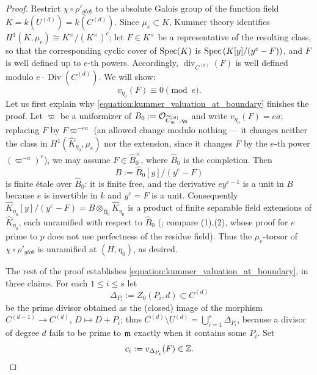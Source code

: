 \begin{proof}
    Restrict $\chi \circ \rho'_{glob}$ to the absolute Galois group of the function field
    $K = k(U^{(d)}) = k(C^{(d)})$. Since $\mu_e \subset K$, Kummer theory identifies
    $H^1(K, \mu_e) \cong K^\times / (K^\times)^e$; let $F \in K^\times$ be a representative of the
    resulting class, so that the corresponding cyclic cover of $\operatorname{Spec}(K)$ is
    $\operatorname{Spec}\left(K[y]/(y^e - F)\right)$, and $F$ is well defined up to $e$-th powers. Accordingly,
    $\operatorname{div}_{C^{(d)}}(F)$ is well defined modulo $e \cdot \operatorname{Div}(C^{(d)})$.
    We will show:
    \begin{equation}\label{equation:kummer_valuation_at_boundary}
        v_{\eta_0}(F) \equiv 0 \pmod{e}.
    \end{equation}
    Let us first explain why \eqref{equation:kummer_valuation_at_boundary} finishes the proof.
    Let $\varpi$ be a uniformizer of $B_0 := \mathcal{O}_{\widetilde{C}_{\mathfrak{m}}^{(d)}, \eta_0}$ and write
    $v_{\eta_0}(F) = e a$; replacing $F$ by $F \varpi^{-ea}$ (an allowed change modulo nothing --- it
    changes neither the class in $H^1(\widehat{K}_{\eta_0}, \mu_e)$ nor the extension, since it changes
    $F$ by the $e$-th power $\left(\varpi^{-a}\right)^e$), we may assume $F \in \widehat{B}_0^\times$, where
    $\widehat{B}_0$ is the completion. Then
    \[ B := \widehat{B}_0[y]/(y^e - F) \]
    is finite \'etale over $\widehat{B}_0$: it is finite free, and the derivative $e y^{e-1}$ is a unit
    in $B$ because $e$ is invertible in $k$ and $y^e = F$ is a unit. Consequently
    $\widehat{K}_{\eta_0}[y]/(y^e - F) = B \otimes_{\widehat{B}_0} \widehat{K}_{\eta_0}$ is a product of
    finite separable field extensions of $\widehat{K}_{\eta_0}$, each unramified with respect to
    $\widehat{B}_0$ (; compare
    (1),(2), whose proof for $e$ prime to $p$ does not use perfectness
    of the residue field). Thus the $\mu_e$-torsor of $\chi \circ \rho'_{glob}$ is unramified at
    $(H, \eta_0)$, as desired.

    The rest of the proof establishes \eqref{equation:kummer_valuation_at_boundary}, in three claims.
    For each $1 \leq i \leq s$ let
    \[ \Delta_{P_i} := Z_0(P_i, d) \subset C^{(d)} \]
    be the prime divisor obtained as the (closed) image of the morphism
    $C^{(d-1)} \to C^{(d)}$, $D \mapsto D + P_i$; thus
    $C^{(d)} \setminus U^{(d)} = \bigcup_{i=1}^{s} \Delta_{P_i}$, because a divisor of degree $d$ fails
    to be prime to $\mathfrak{m}$ exactly when it contains some $P_i$. Set
    \[ c_i := v_{\Delta_{P_i}}(F) \in \mathbb{Z}. \]


\end{proof}
